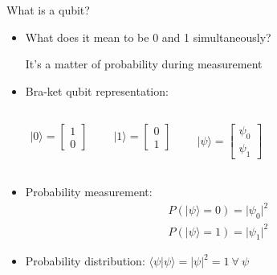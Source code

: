 \begin{frame}{What is a qubit?}
		\begin{itemize}
			\item What does it mean to be 0 and 1 simultaneously?
			
			    It's a matter of probability during measurement
			
            \item Bra-ket qubit representation:
            \begin{columns}[T,onlytextwidth]
			\centering
			\begin{align*}
			    \lvert 0\rangle
			     = 
                \begin{bmatrix}
                1 \\
                0
                \end{bmatrix}
            \end{align*}
			
			\centering
            \begin{align*}
			    \lvert 1\rangle
			    = 
                \begin{bmatrix}
                0 \\
                1
                \end{bmatrix}
            \end{align*}
            
			\centering
            \begin{align*}
			    \lvert \psi\rangle
			    = 
                \begin{bmatrix}
                \psi_0 \\
                \psi_1
                \end{bmatrix}
            \end{align*}
		\end{columns}
		
		
		\item Probability measurement:
		    \begin{align*}
			    P(\lvert \psi\rangle = 0) = \lvert\psi_0\rvert^2
			\end{align*}
			\begin{align*}
			    P(\lvert \psi\rangle = 1) = \lvert\psi_1\rvert^2
            \end{align*}
		\item Probability distribution: $\langle \psi\lvert \psi \rangle = |\psi|^2 = 1 \ \forall \ \psi$

        \end{itemize}
\end{frame}

